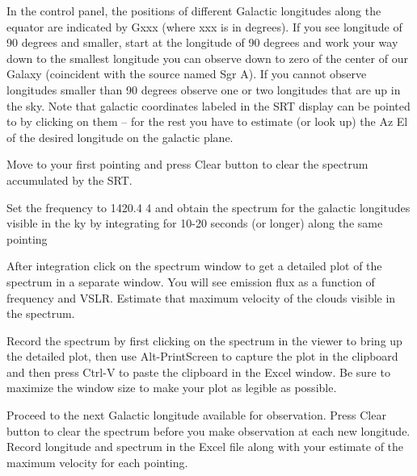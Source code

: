 \begin{steps}
	\item In the control panel, the positions of different Galactic longitudes along
	the equator are indicated by Gxxx (where xxx is in degrees). If you see
	longitude of 90 degrees and smaller, start at the longitude of 90
	degrees and work your way down to the smallest longitude you can
	observe down to zero of the center of our Galaxy (coincident with the
	source named Sgr A). If you cannot observe longitudes smaller than
	90 degrees observe one or two longitudes that are up in the sky. Note
	that galactic coordinates labeled in the SRT display can be pointed to
	by clicking on them – for the rest you have to estimate (or look up) the
	Az El of the desired longitude on the galactic plane. 
	
	\item Move to your first pointing and press Clear button to clear the spectrum accumulated by the SRT.
	
	\item  Set the frequency to 1420.4 4 and obtain the spectrum for the galactic longitudes visible in the ky by integrating for 10-20 seconds (or longer) along the same pointing
	
	\item After integration click on the spectrum window to get a detailed plot of
	the spectrum in a separate window. You will see emission flux as a
	function of frequency and VSLR. Estimate that maximum velocity of
	the clouds visible in the spectrum.
	
	\item Record the spectrum by first clicking on the spectrum in the viewer to
	bring up the detailed plot, then use Alt-PrintScreen to capture the plot
	in the clipboard and then press Ctrl-V to paste the clipboard in the
	Excel window. Be sure to maximize the window size to make your plot as legible as possible. 
	
	\item Proceed to the next Galactic longitude available for observation. Press Clear button to clear the spectrum before you make observation at
	each new longitude. Record longitude and spectrum in the Excel file
	along with your estimate of the maximum velocity for each pointing.
\end{steps}


















